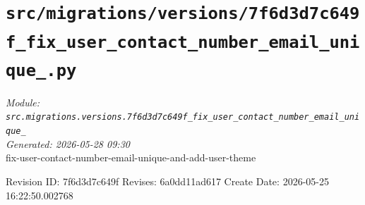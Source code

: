 
\section{\texttt{src/migrations/versions/7f6d3d7c649f\_fix\_user\_contact\_number\_email\_unique\_.py}}
\textit{Module: \texttt{src.migrations.versions.7f6d3d7c649f\_fix\_user\_contact\_number\_email\_unique\_}} \\
\textit{Generated: 2026-05-28 09:30} \\

fix-user-contact-number-email-unique-and-add-user-theme

Revision ID: 7f6d3d7c649f
Revises: 6a0dd11ad617
Create Date: 2026-05-25 16:22:50.002768
